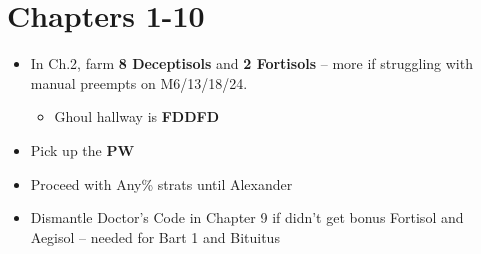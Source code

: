 \chapter{Chapters 1-10}

\begin{itemize}
	\item In Ch.2, farm \textbf{8 Deceptisols} and \textbf{2 Fortisols} -- more if struggling with manual preempts on M6/13/18/24.
		\begin{itemize}
			\item Ghoul hallway is \textbf{FDDFD}
		\end{itemize}
	\item Pick up the \textbf{PW}
	\item Proceed with Any\% strats until Alexander
	\item Dismantle Doctor's Code in Chapter 9 if didn't get bonus Fortisol and Aegisol -- needed for Bart 1 and Bituitus
\end{itemize}